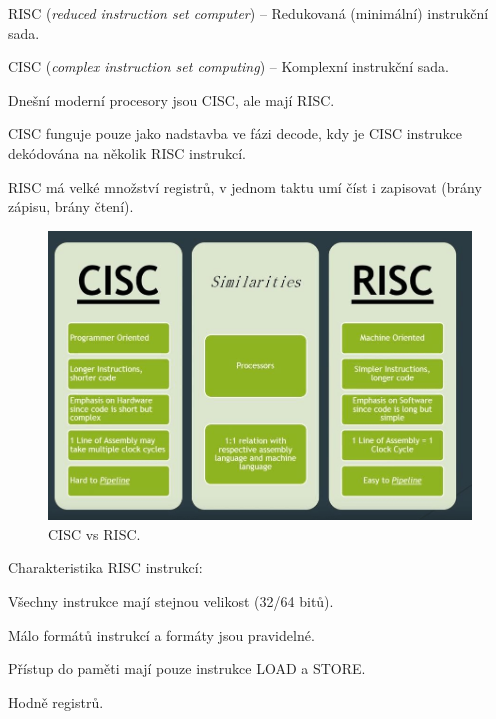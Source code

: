\begin{compactitem}
    \item RISC (\textit{reduced instruction set computer}) -- Redukovaná (minimální) instrukční sada.

    \item CISC (\textit{complex instruction set computing}) -- Komplexní instrukční sada.

    \item Dnešní moderní procesory jsou CISC, ale  mají RISC.

    \item CISC funguje pouze jako nadstavba ve fázi decode, kdy je CISC instrukce dekódována na několik RISC instrukcí.

    \item RISC má velké množství registrů, v jednom taktu umí číst i zapisovat (brány zápisu, brány čtení).

    \begin{figure}[H]
        \centering
        \includegraphics[width=1\linewidth]{cisc_vs_risc.png}
        \caption{CISC vs RISC.}
    \end{figure}

    \item Charakteristika RISC instrukcí: \begin{compactitem}
        \item Všechny instrukce mají stejnou velikost (32/64 bitů).
        \item Málo formátů instrukcí a formáty jsou pravidelné.
        \item Přístup do paměti mají pouze instrukce LOAD a STORE.
        \item Hodně registrů.
    \end{compactitem}


\end{compactitem}
